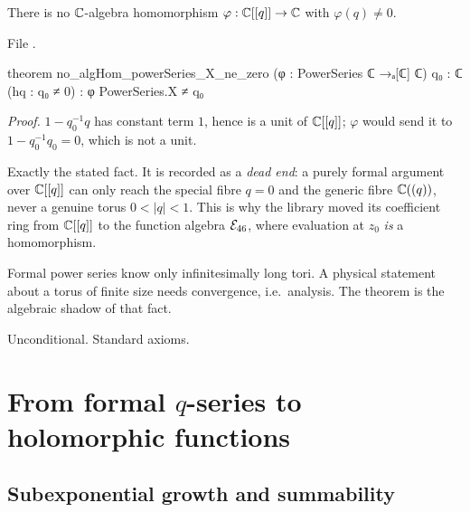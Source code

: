 \begin{theorem}\label{l14:thm:noalghom}
There is no ${\mathbb{C}}$-algebra homomorphism $\varphi:{\mathbb{C}}[[q]]\to{\mathbb{C}}$ with $\varphi(q)\neq0$.
\end{theorem}
\noindent File .
\begin{leancode}
theorem no_algHom_powerSeries_X_ne_zero (φ : PowerSeries ℂ →ₐ[ℂ] ℂ) {q₀ : ℂ} (hq : q₀ ≠ 0) :
    φ PowerSeries.X ≠ q₀
\end{leancode}
\noindent\emph{Proof.} $1 - q_0^{-1}q$ has constant term $1$, hence is a unit of ${\mathbb{C}}[[q]]$; $\varphi$ would send it to
$1 - q_0^{-1}q_0 = 0$, which is not a unit.
\begin{dictionary}
Exactly the stated fact. It is recorded as a \emph{dead end}: a purely formal argument over ${\mathbb{C}}[[q]]$ can only reach the
special fibre $q=0$ and the generic fibre ${\mathbb{C}}((q))$, never a genuine torus $0<|q|<1$. This is why the library moved its
coefficient ring from ${\mathbb{C}}[[q]]$ to the function algebra $\mathcal{E}_{46}$, where evaluation at $z_0$ \emph{is} a homomorphism.
\end{dictionary}
\begin{physics}
Formal power series know only infinitesimally long tori. A physical statement about a torus of finite size needs
convergence, i.e.\ analysis. The theorem is the algebraic shadow of that fact.
\end{physics}
\begin{status}
Unconditional. Standard axioms.
\end{status}

\section{From formal \texorpdfstring{$q$}{q}-series to holomorphic functions}\label{l14:sec:bridge}

\subsection{Subexponential growth and summability}

